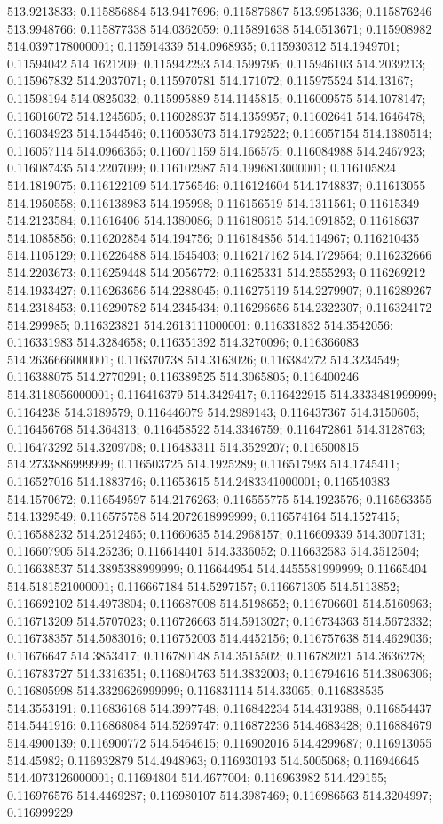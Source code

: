 513.9213833; 0.115856884 513.9417696; 0.115876867 513.9951336; 0.115876246 513.9948766; 0.115877338 514.0362059; 0.115891638 514.0513671; 0.115908982 514.0397178000001; 0.115914339 514.0968935; 0.115930312 514.1949701; 0.11594042 514.1621209; 0.115942293 514.1599795; 0.115946103 514.2039213; 0.115967832 514.2037071; 0.115970781 514.171072; 0.115975524 514.13167; 0.11598194 514.0825032; 0.115995889 514.1145815; 0.116009575 514.1078147; 0.116016072 514.1245605; 0.116028937 514.1359957; 0.11602641 514.1646478; 0.116034923 514.1544546; 0.116053073 514.1792522; 0.116057154 514.1380514; 0.116057114 514.0966365; 0.116071159 514.166575; 0.116084988 514.2467923; 0.116087435 514.2207099; 0.116102987 514.1996813000001; 0.116105824 514.1819075; 0.116122109 514.1756546; 0.116124604 514.1748837; 0.11613055 514.1950558; 0.116138983 514.195998; 0.116156519 514.1311561; 0.11615349 514.2123584; 0.11616406 514.1380086; 0.116180615 514.1091852; 0.11618637 514.1085856; 0.116202854 514.194756; 0.116184856 514.114967; 0.116210435 514.1105129; 0.116226488 514.1545403; 0.116217162 514.1729564; 0.116232666 514.2203673; 0.116259448 514.2056772; 0.11625331 514.2555293; 0.116269212 514.1933427; 0.116263656 514.2288045; 0.116275119 514.2279907; 0.116289267 514.2318453; 0.116290782 514.2345434; 0.116296656 514.2322307; 0.116324172 514.299985; 0.116323821 514.2613111000001; 0.116331832 514.3542056; 0.116331983 514.3284658; 0.116351392 514.3270096; 0.116366083 514.2636666000001; 0.116370738 514.3163026; 0.116384272 514.3234549; 0.116388075 514.2770291; 0.116389525 514.3065805; 0.116400246 514.3118056000001; 0.116416379 514.3429417; 0.116422915 514.3333481999999; 0.1164238 514.3189579; 0.116446079 514.2989143; 0.116437367 514.3150605; 0.116456768 514.364313; 0.116458522 514.3346759; 0.116472861 514.3128763; 0.116473292 514.3209708; 0.116483311 514.3529207; 0.116500815 514.2733886999999; 0.116503725 514.1925289; 0.116517993 514.1745411; 0.116527016 514.1883746; 0.11653615 514.2483341000001; 0.116540383 514.1570672; 0.116549597 514.2176263; 0.116555775 514.1923576; 0.116563355 514.1329549; 0.116575758 514.2072618999999; 0.116574164 514.1527415; 0.116588232 514.2512465; 0.11660635 514.2968157; 0.116609339 514.3007131; 0.116607905 514.25236; 0.116614401 514.3336052; 0.116632583 514.3512504; 0.116638537 514.3895388999999; 0.116644954 514.4455581999999; 0.11665404 514.5181521000001; 0.116667184 514.5297157; 0.116671305 514.5113852; 0.116692102 514.4973804; 0.116687008 514.5198652; 0.116706601 514.5160963; 0.116713209 514.5707023; 0.116726663 514.5913027; 0.116734363 514.5672332; 0.116738357 514.5083016; 0.116752003 514.4452156; 0.116757638 514.4629036; 0.11676647 514.3853417; 0.116780148 514.3515502; 0.116782021 514.3636278; 0.116783727 514.3316351; 0.116804763 514.3832003; 0.116794616 514.3806306; 0.116805998 514.3329626999999; 0.116831114 514.33065; 0.116838535 514.3553191; 0.116836168 514.3997748; 0.116842234 514.4319388; 0.116854437 514.5441916; 0.116868084 514.5269747; 0.116872236 514.4683428; 0.116884679 514.4900139; 0.116900772 514.5464615; 0.116902016 514.4299687; 0.116913055 514.45982; 0.116932879 514.4948963; 0.116930193 514.5005068; 0.116946645 514.4073126000001; 0.11694804 514.4677004; 0.116963982 514.429155; 0.116976576 514.4469287; 0.116980107 514.3987469; 0.116986563 514.3204997; 0.116999229 